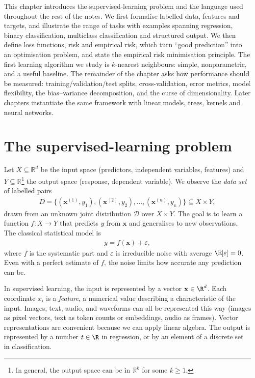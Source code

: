 \documentclass[a4paper, 12pt]{book}
\begin{document}
This chapter introduces the supervised-learning problem and the language used
throughout the rest of the notes. We first formalise labelled data, features and
targets, and illustrate the range of tasks with examples spanning regression,
binary classification, multiclass classification and structured output. We then
define loss functions, risk and empirical risk, which turn ``good prediction''
into an optimisation problem, and state the empirical risk minimisation
principle. The first learning algorithm we study is \texorpdfstring{$k$}{k}-nearest
neighbours: simple, nonparametric, and a useful baseline. The remainder of the
chapter asks how performance should be measured: training/validation/test splits,
cross-validation, error metrics, model flexibility, the bias--variance
decomposition, and the curse of dimensionality. Later chapters instantiate the
same framework with linear models, trees, kernels and neural networks.

\section{The supervised-learning problem}

Let $X \subseteq \mathbb{R}^{d}$ be the input space (predictors, independent variables, features) and $Y \subseteq \mathbb{R}$\footnote{In general, the output space can be in $\mathbb{R}^k$ for some $k \geq 1$.} the output space (response, dependent variable). We observe
the \emph{data set} of labelled pairs
\begin{align}
    D = \bigg\{ (\mathbf{x}^{(1)}, y_1), (\mathbf{x}^{(2)}, y_2), \ldots, (\mathbf{x}^{(n)}, y_n) \bigg\} \subseteq X \times Y,
\end{align}
drawn from an unknown joint distribution $\mathscr{D}$ over $X \times Y$. The goal is to learn a function
$f : X \to Y$ that predicts $y$ from $\mathbf{x}$ and
generalises to new observations.  The classical statistical model is
\begin{align}
    y = f(\mathbf{x}) + \varepsilon,
\end{align}
where $f$ is the systematic part and $\varepsilon$ is irreducible noise with average $\E[\varepsilon]=0$. Even with a perfect estimate of $f$, the noise limits how
accurate any prediction can be.

In supervised learning, the input is represented by a vector
$\mathbf{x} \in \R^d$. Each coordinate $x_i$ is a \emph{feature}, a numerical value describing a characteristic of the input. Images, text, audio, and waveforms can all be represented this way (images as pixel vectors, text as token counts or embeddings, audio as frames). Vector representations are convenient because we can apply linear algebra. The output is represented by a number $t \in \R$ in regression, or by an element of a discrete set in classification.
\end{document}
